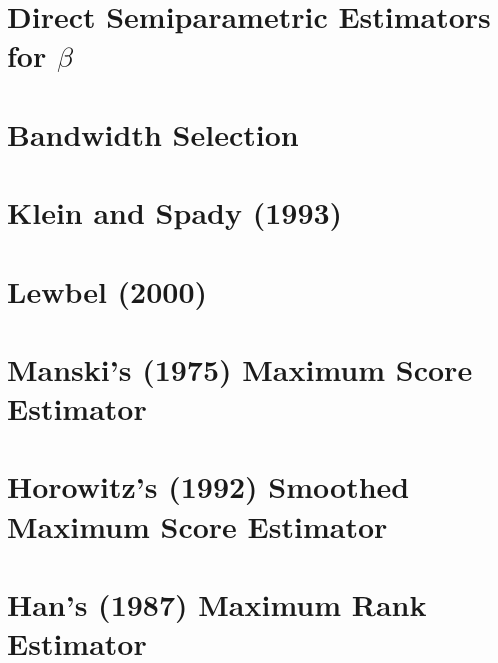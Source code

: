 \documentclass[xcolor=svgnames,dvipdfmx,cjk]{beamer}
\theoremstyle{example}
\begin{document}
\section{Direct Semiparametric Estimators for $\beta$}










\section{Bandwidth Selection}









\section{Klein and Spady (1993)}









\section{Lewbel (2000)}










\section{Manski's (1975) Maximum Score Estimator}









\section{Horowitz's (1992) Smoothed Maximum Score Estimator}











\section{Han's (1987) Maximum Rank Estimator}
\end{document}
